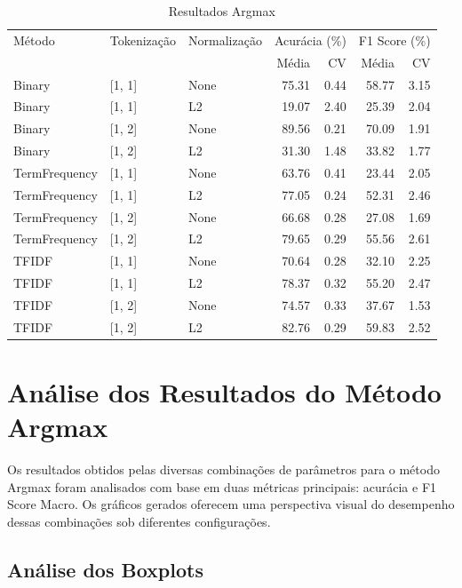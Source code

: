 \begin{table}[H]
\centering
\caption{Resultados Argmax}
\label{resultadoargmax}
\begin{tabular}{lllrrrr}
\toprule
Método & Tokenização & Normalização & \multicolumn{2}{c}{Acurácia (\%)} & \multicolumn{2}{c}{F1 Score (\%)} \\
\cmidrule(lr){4-5} \cmidrule(lr){6-7}
 &  &  & Média & CV & Média & CV \\
\midrule
Binary & [1, 1] & None & 75.31 & 0.44 & 58.77 & 3.15 \\
Binary & [1, 1] & L2 & 19.07 & 2.40 & 25.39 & 2.04 \\
Binary & [1, 2] & None & 89.56 & 0.21 & 70.09 & 1.91 \\
Binary & [1, 2] & L2 & 31.30 & 1.48 & 33.82 & 1.77 \\
TermFrequency & [1, 1] & None & 63.76 & 0.41 & 23.44 & 2.05 \\
TermFrequency & [1, 1] & L2 & 77.05 & 0.24 & 52.31 & 2.46 \\
TermFrequency & [1, 2] & None & 66.68 & 0.28 & 27.08 & 1.69 \\
TermFrequency & [1, 2] & L2 & 79.65 & 0.29 & 55.56 & 2.61 \\
TFIDF & [1, 1] & None & 70.64 & 0.28 & 32.10 & 2.25 \\
TFIDF & [1, 1] & L2 & 78.37 & 0.32 & 55.20 & 2.47 \\
TFIDF & [1, 2] & None & 74.57 & 0.33 & 37.67 & 1.53 \\
TFIDF & [1, 2] & L2 & 82.76 & 0.29 & 59.83 & 2.52 \\
\bottomrule
\end{tabular}
\end{table}


\section{Análise dos Resultados do Método Argmax}

Os resultados obtidos pelas diversas combinações de parâmetros para o método Argmax foram analisados com base em duas métricas principais: acurácia e F1 Score Macro. Os gráficos gerados oferecem uma perspectiva visual do desempenho dessas combinações sob diferentes configurações.

\subsection{Análise dos Boxplots}

